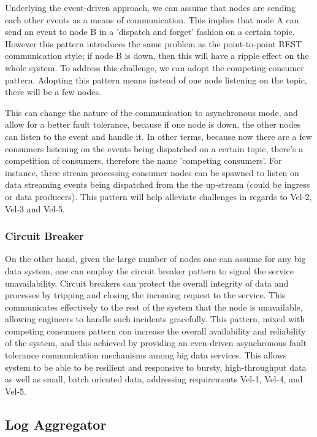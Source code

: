 \documentclass[conference]{IEEEtran}
\begin{document}
Underlying the event-driven approach, we can assume that nodes are sending each other events as a means of communication. This implies that node A can send an event to node B in a 'dispatch and forget' fashion on a certain topic. However this pattern introduces the same problem as the point-to-point REST communication style; if node B is down, then this will have a ripple effect on the whole system. To address this challenge, we can adopt the competing consumer pattern. Adopting this pattern means instead of one node listening on the topic, there will be a few nodes. 

This can change the nature of the communication to asynchronous mode, and allow for a better fault tolerance, because if one node is down, the other nodes can listen to the event and handle it. In other terms, because now there are a few consumers listening on the events being dispatched on a certain topic, there's a competition of consumers, therefore the name 'competing consumers'. For instance, three stream processing consumer nodes can be spawned to listen on data streaming events being dispatched from the the up-stream (could be ingress or data producers). This pattern will help alleviate challenges in regards to Vel-2, Vel-3 and Vel-5.

\subsubsection{Circuit Breaker}

On the other hand, given the large number of nodes one can assume for any big data system, one can employ the circuit breaker pattern to signal the service unavailability. Circuit breakers can protect the overall integrity of data and processes by tripping and closing the incoming request to the service. This communicates effectively to the rest of the system that the node is unavailable, allowing engineers to handle such incidents gracefully. This pattern, mixed with competing consumers pattern con increase the overall availability and reliability of the system, and this achieved by providing an even-driven asynchronous fault tolerance communication mechanisms among big data services. This allows system to be able to be resilient and responsive to bursty, high-throughput data as well as small, batch oriented data, addressing requirements Vel-1, Vel-4, and Vel-5. 
    
\subsection{Log Aggregator}
\end{document}
